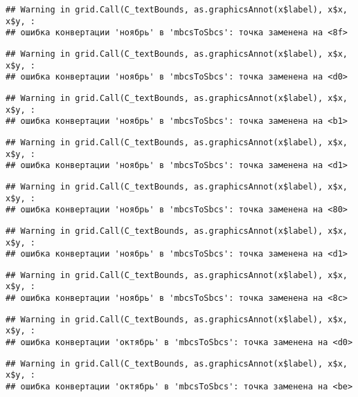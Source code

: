 \documentclass[
]{article}
\begin{document}
\begin{verbatim}
## Warning in grid.Call(C_textBounds, as.graphicsAnnot(x$label), x$x, x$y, :
## ошибка конвертации 'ноябрь' в 'mbcsToSbcs': точка заменена на <8f>
\end{verbatim}

\begin{verbatim}
## Warning in grid.Call(C_textBounds, as.graphicsAnnot(x$label), x$x, x$y, :
## ошибка конвертации 'ноябрь' в 'mbcsToSbcs': точка заменена на <d0>
\end{verbatim}

\begin{verbatim}
## Warning in grid.Call(C_textBounds, as.graphicsAnnot(x$label), x$x, x$y, :
## ошибка конвертации 'ноябрь' в 'mbcsToSbcs': точка заменена на <b1>
\end{verbatim}

\begin{verbatim}
## Warning in grid.Call(C_textBounds, as.graphicsAnnot(x$label), x$x, x$y, :
## ошибка конвертации 'ноябрь' в 'mbcsToSbcs': точка заменена на <d1>
\end{verbatim}

\begin{verbatim}
## Warning in grid.Call(C_textBounds, as.graphicsAnnot(x$label), x$x, x$y, :
## ошибка конвертации 'ноябрь' в 'mbcsToSbcs': точка заменена на <80>
\end{verbatim}

\begin{verbatim}
## Warning in grid.Call(C_textBounds, as.graphicsAnnot(x$label), x$x, x$y, :
## ошибка конвертации 'ноябрь' в 'mbcsToSbcs': точка заменена на <d1>
\end{verbatim}

\begin{verbatim}
## Warning in grid.Call(C_textBounds, as.graphicsAnnot(x$label), x$x, x$y, :
## ошибка конвертации 'ноябрь' в 'mbcsToSbcs': точка заменена на <8c>
\end{verbatim}

\begin{verbatim}
## Warning in grid.Call(C_textBounds, as.graphicsAnnot(x$label), x$x, x$y, :
## ошибка конвертации 'октябрь' в 'mbcsToSbcs': точка заменена на <d0>
\end{verbatim}

\begin{verbatim}
## Warning in grid.Call(C_textBounds, as.graphicsAnnot(x$label), x$x, x$y, :
## ошибка конвертации 'октябрь' в 'mbcsToSbcs': точка заменена на <be>
\end{verbatim}
\end{document}

